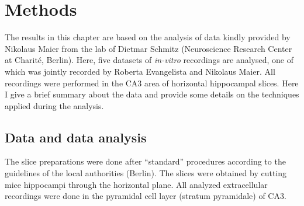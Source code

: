   \begin{comment}
    A differential short-term depression of I-to-E and I-to-I synapses could
    also explain the observed correlation between SWR amplitude and the
    following interval to the next SWR. For simplicity we neglect short-term
    depression of I-to-E synapses. The recovery from depression (after a SWR)
    of I-to-I synapses (Kohus et al., 2016) increases these synapses with a
    time constant on the order of hundreds of milliseconds. As a result, the
    activity of the inhibitory neurons gradually decreases, which in turn
    reduces the inhibition onto pyramidal cells. Pyramidal cells in CA3 slowly
    increase their activity long before a SWR (Hulse et al, 2016) until some
    critical activity level is reached where additional fluctuations/noise can
    trigger a new SWR.
  \end{comment}



\section{Methods}
  The results in this chapter are based on the analysis of data kindly provided
  by Nikolaus Maier from the lab of Dietmar Schmitz (Neuroscience Research
  Center at Charit\'{e}, Berlin). Here, five datasets of \textit{in-vitro}
  recordings are analysed, one of which was jointly recorded by Roberta
  Evangelista and Nikolaus Maier. All recordings were performed in the CA3 area
  of horizontal hippocampal slices. Here I give a brief summary about the data
  and provide some details on the techniques applied during the analysis.


  \subsection{Data and data analysis}
    The slice preparations were done after ``standard'' procedures
    \citep{Maier2003, Maier2012} according to the guidelines of the local
    authorities (Berlin). The slices were obtained by cutting mice hippocampi
    through the horizontal plane. All analyzed extracellular recordings were
    done in the pyramidal cell layer (stratum pyramidale) of CA3.

